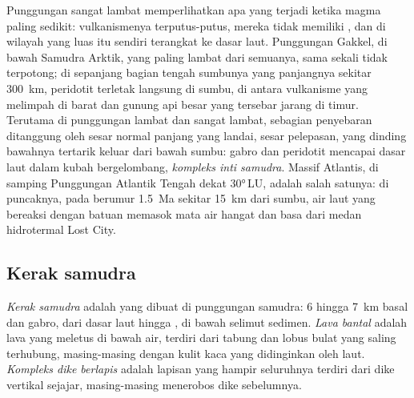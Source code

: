 Punggungan sangat lambat memperlihatkan apa yang terjadi ketika magma paling sedikit: vulkanismenya terputus-putus, mereka tidak memiliki , dan di wilayah yang luas  itu sendiri terangkat ke dasar laut. Punggungan Gakkel, di bawah Samudra Arktik, yang paling lambat dari semuanya, sama sekali tidak terpotong; di sepanjang bagian tengah sumbunya yang panjangnya sekitar \qty{300}{km}, peridotit  terletak langsung di sumbu, di antara vulkanisme yang melimpah di barat dan gunung api besar yang tersebar jarang di timur. Terutama di punggungan lambat dan sangat lambat, sebagian penyebaran ditanggung oleh sesar normal panjang yang landai, sesar pelepasan, yang dinding bawahnya tertarik keluar dari bawah sumbu: gabro dan peridotit mencapai dasar laut dalam kubah bergelombang, \emph{kompleks inti samudra}. Massif Atlantis, di samping Punggungan Atlantik Tengah dekat \ang{30}\,LU, adalah salah satunya: di puncaknya, pada  berumur \qty{1.5}{Ma} sekitar \qty{15}{km} dari sumbu, air laut yang bereaksi dengan batuan  memasok mata air hangat dan basa dari medan hidrotermal Lost City.

\subsection*{Kerak samudra}

\begin{definition}\label{def:b1:rifts-ridges-margins:oceanic-crust}
\emph{Kerak samudra} adalah  yang dibuat di punggungan samudra: 6 hingga \qty{7}{km} basal dan gabro, dari dasar laut hingga , di bawah selimut sedimen. \emph{Lava bantal} adalah lava yang meletus di bawah air, terdiri dari tabung dan lobus bulat yang saling terhubung, masing-masing dengan kulit kaca yang didinginkan oleh laut. \emph{Kompleks dike berlapis} adalah lapisan yang hampir seluruhnya terdiri dari dike vertikal sejajar, masing-masing menerobos dike sebelumnya.
\end{definition}

